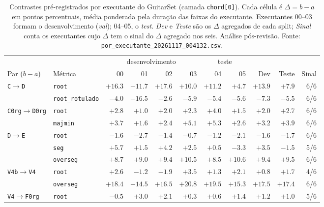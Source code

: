 \begin{table}[t]
  \centering
  \caption{Contrastes pré-registrados por executante do GuitarSet (camada \texttt{chord[0]}). Cada célula é $\Delta = b - a$ em pontos percentuais, média ponderada pela duração das faixas do executante. Executantes 00--03 formam o desenvolvimento (\emph{val}); 04--05, o \emph{test}. \emph{Dev} e \emph{Teste} são os $\Delta$ agregados de cada split; \emph{Sinal} conta os executantes cujo $\Delta$ tem o sinal do $\Delta$ agregado nos seis. Análise pós-revisão. Fonte: \texttt{por\_executante\_20261117\_004132.csv}.}
  \label{tab:executantes}
  \footnotesize
  \begin{tabular}{llrrrrrrrrr}
    \toprule
     & & \multicolumn{4}{c}{desenvolvimento} & \multicolumn{2}{c}{teste} & & & \\
    \cmidrule(lr){3-6}\cmidrule(lr){7-8}
    Par ($b-a$) & Métrica & 00 & 01 & 02 & 03 & 04 & 05 & Dev & Teste & Sinal \\
    \midrule
    \texttt{C}$\to$\texttt{D} & \texttt{root} & $+16.3$ & $+11.7$ & $+17.6$ & $+10.0$ & $+11.2$ & $+4.7$ & $+13.9$ & $+7.9$ & 6/6 \\
     & \texttt{root\_rotulado} & $-4.0$ & $-16.5$ & $-2.6$ & $-5.9$ & $-5.4$ & $-5.6$ & $-7.3$ & $-5.5$ & 6/6 \\
    \addlinespace
    \texttt{C0rg}$\to$\texttt{D0rg} & \texttt{root} & $+2.8$ & $+1.0$ & $+2.0$ & $+2.3$ & $+4.0$ & $+1.5$ & $+2.0$ & $+2.7$ & 6/6 \\
     & \texttt{majmin} & $+3.7$ & $+1.6$ & $+2.4$ & $+5.1$ & $+5.3$ & $+2.6$ & $+3.2$ & $+3.9$ & 6/6 \\
    \addlinespace
    \texttt{D}$\to$\texttt{E} & \texttt{root} & $-1.6$ & $-2.7$ & $-1.4$ & $-0.7$ & $-1.2$ & $-2.1$ & $-1.6$ & $-1.7$ & 6/6 \\
     & \texttt{seg} & $+5.7$ & $+1.5$ & $+4.2$ & $+2.5$ & $+0.5$ & $-3.3$ & $+3.5$ & $-1.5$ & 5/6 \\
     & \texttt{overseg} & $+8.7$ & $+9.0$ & $+9.4$ & $+10.5$ & $+8.5$ & $+10.6$ & $+9.4$ & $+9.5$ & 6/6 \\
    \addlinespace
    \texttt{V4b}$\to$\texttt{V4} & \texttt{root} & $+2.6$ & $-1.2$ & $-1.9$ & $+3.5$ & $+1.3$ & $+2.1$ & $+0.8$ & $+1.7$ & 4/6 \\
     & \texttt{overseg} & $+18.4$ & $+14.5$ & $+16.5$ & $+20.8$ & $+19.5$ & $+15.3$ & $+17.5$ & $+17.4$ & 6/6 \\
    \addlinespace
    \texttt{V4}$\to$\texttt{F0rg} & \texttt{root} & $-0.5$ & $+3.0$ & $+2.1$ & $+0.3$ & $+0.6$ & $+1.4$ & $+1.2$ & $+1.0$ & 5/6 \\

\end{tabular}
\end{table}
